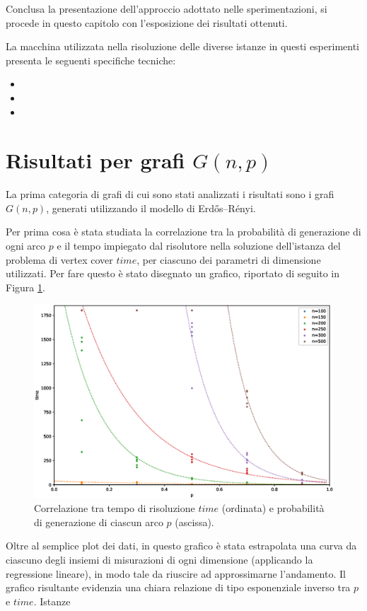 Conclusa la presentazione dell'approccio adottato nelle sperimentazioni, si procede in questo capitolo con l'esposizione dei risultati ottenuti. 

La macchina utilizzata nella risoluzione delle diverse istanze in questi esperimenti presenta le seguenti specifiche tecniche:
\begin{itemize}
\item
\item
\item
\end{itemize}

\newpage
\section{Risultati per grafi $G(n,p)$}
La prima categoria di grafi di cui sono stati analizzati i risultati sono i grafi $G(n,p)$, generati utilizzando il modello di Erdős–Rényi. 

Per prima cosa è stata studiata la correlazione tra la probabilità di generazione di ogni arco $p$ e il tempo impiegato dal risolutore nella soluzione dell'istanza del problema di vertex cover $time$, per ciascuno dei parametri di dimensione utilizzati. Per fare questo è stato disegnato un grafico, riportato di seguito in Figura \ref{fig:gnp2d}.
\begin{figure}[h!]
     \centering
       \includegraphics[scale=0.4]{images/gnp-2d.eps}
       \caption{Correlazione tra tempo di risoluzione $time$ (ordinata) e probabilità di generazione di ciascun arco $p$ (ascissa).}
        \label{fig:gnp2d}
\end{figure}

Oltre al semplice plot dei dati, in questo grafico è stata estrapolata una curva da ciascuno degli insiemi di misurazioni di ogni dimensione (applicando la regressione lineare), in modo tale da riuscire ad approssimarne l'andamento. Il grafico risultante evidenzia una chiara relazione di tipo esponenziale inverso tra $p$ e $time$. Istanze 

